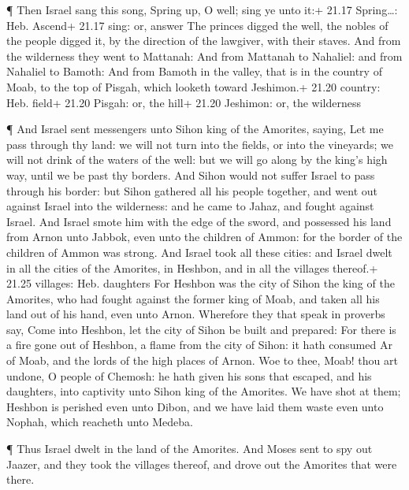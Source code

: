  ¶ Then Israel sang this song, Spring up, O well; sing ye
unto it:+ 21.17 Spring\ldots: Heb. Ascend+ 21.17 sing: or, answer
 The princes digged the well, the nobles of the people
digged it, by the direction of the lawgiver, with their staves. And from
the wilderness they went to Mattanah:  And from Mattanah to
Nahaliel: and from Nahaliel to Bamoth:  And from Bamoth in
the valley, that is in the country of Moab, to the top of Pisgah, which
looketh toward Jeshimon.+ 21.20 country: Heb. field+ 21.20 Pisgah: or,
the hill+ 21.20 Jeshimon: or, the wilderness

 ¶ And Israel sent messengers unto Sihon king of the
Amorites, saying,  Let me pass through thy land: we will
not turn into the fields, or into the vineyards; we will not drink of
the waters of the well: but we will go along by the king's high way,
until we be past thy borders.  And Sihon would not suffer
Israel to pass through his border: but Sihon gathered all his people
together, and went out against Israel into the wilderness: and he came
to Jahaz, and fought against Israel.  And Israel smote him
with the edge of the sword, and possessed his land from Arnon unto
Jabbok, even unto the children of Ammon: for the border of the children
of Ammon was strong.  And Israel took all these cities: and
Israel dwelt in all the cities of the Amorites, in Heshbon, and in all
the villages thereof.+ 21.25 villages: Heb. daughters  For
Heshbon was the city of Sihon the king of the Amorites, who had fought
against the former king of Moab, and taken all his land out of his hand,
even unto Arnon.  Wherefore they that speak in proverbs
say, Come into Heshbon, let the city of Sihon be built and prepared:
 For there is a fire gone out of Heshbon, a flame from the
city of Sihon: it hath consumed Ar of Moab, and the lords of the high
places of Arnon.  Woe to thee, Moab! thou art undone, O
people of Chemosh: he hath given his sons that escaped, and his
daughters, into captivity unto Sihon king of the Amorites. 
We have shot at them; Heshbon is perished even unto Dibon, and we have
laid them waste even unto Nophah, which reacheth unto Medeba.

 ¶ Thus Israel dwelt in the land of the Amorites.
 And Moses sent to spy out Jaazer, and they took the
villages thereof, and drove out the Amorites that were there.

